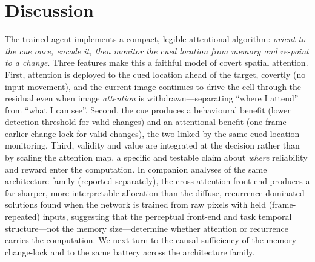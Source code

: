 \documentclass[11pt]{article}
\begin{document}
\section{Discussion}
The trained agent implements a compact, legible attentional algorithm: \emph{orient to the cue once,
encode it, then monitor the cued location from memory and re-point to a change}. Three features make
this a faithful model of covert spatial attention. First, attention is deployed to the cued location
ahead of the target, covertly (no input movement), and the current image continues to drive the cell
through the residual even when image \emph{attention} is withdrawn---separating ``where I attend'' from
``what I can see''. Second, the cue produces a behavioural benefit (lower detection threshold for valid
changes) and an attentional benefit (one-frame-earlier change-lock for valid changes), the two linked by
the same cued-location monitoring. Third, validity and value are integrated at the decision rather than
by scaling the attention map, a specific and testable claim about \emph{where} reliability and reward
enter the computation. In companion analyses of the same architecture family (reported separately), the
cross-attention front-end produces a far sharper, more interpretable allocation than the diffuse,
recurrence-dominated solutions found when the network is trained from raw pixels with held
(frame-repeated) inputs, suggesting that the perceptual front-end and task temporal structure---not the
memory size---determine whether attention or recurrence carries the computation. We next turn to the causal sufficiency of the memory change-lock and to the same battery
across the architecture family.
\end{document}
